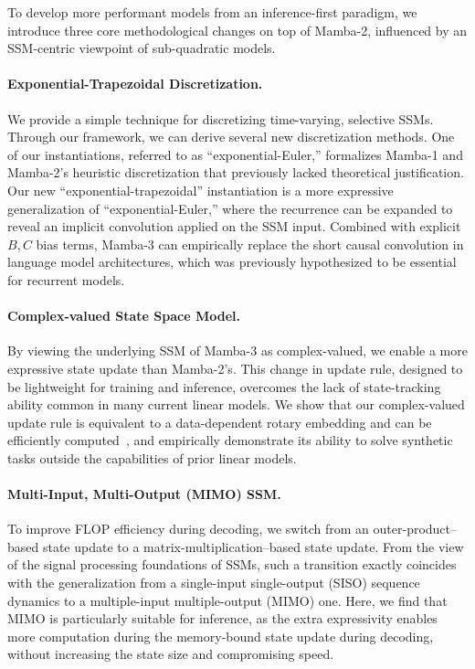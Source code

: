 \documentclass{article}
\newcommand{\citep}{\parencite}
\theoremstyle{plain}
\theoremstyle{definition}
\theoremstyle{remark}
\begin{document}
To develop more performant models from an inference-first paradigm, we introduce three core methodological changes on top of Mamba-2, influenced by an SSM-centric viewpoint of sub-quadratic models.

\paragraph{Exponential-Trapezoidal Discretization.} 
We provide a simple technique for discretizing time-varying, selective SSMs.
Through our framework, we can derive several new discretization methods.
One of our instantiations, referred to as ``exponential-Euler,'' formalizes Mamba-1 and Mamba-2's heuristic discretization that previously lacked theoretical justification.
Our new ``exponential-trapezoidal'' instantiation is a more expressive generalization of ``exponential-Euler,'' where the recurrence can be expanded to reveal an implicit convolution applied on the SSM input. 
Combined with explicit $B,C$ bias terms,
Mamba-3 can empirically replace the short causal convolution in language model architectures, which was previously hypothesized to be essential for recurrent models.

\paragraph{Complex-valued State Space Model.} By viewing the underlying SSM of Mamba-3 as complex-valued, we enable a more expressive state update than Mamba-2's. This change in update rule, designed to be lightweight for training and inference, overcomes the lack of state-tracking ability common in many current linear models. We show that our complex-valued update rule is equivalent to a data-dependent rotary embedding and can be efficiently computed~\citep{su2023roformerenhancedtransformerrotary}, and empirically demonstrate its ability to solve synthetic tasks outside the capabilities of prior linear models.

\paragraph{Multi-Input, Multi-Output (MIMO) SSM.} To improve FLOP efficiency during decoding, we switch from an outer-product–based state update to a matrix-multiplication–based state update.
From the view of the signal processing foundations of SSMs, such a transition exactly coincides with the generalization from a single-input single-output (SISO) sequence dynamics to a multiple-input multiple-output (MIMO) one. Here, we find that MIMO is particularly suitable for inference, as the extra expressivity enables more computation during the memory-bound state update during decoding, without increasing the state size and compromising speed.
\end{document}
